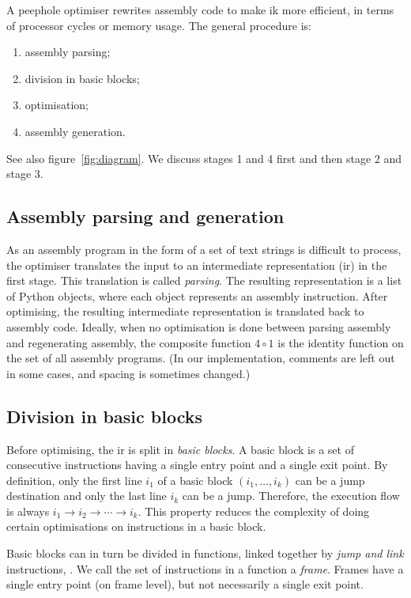 A peephole optimiser rewrites assembly code to make ik more efficient, in terms of processor cycles or memory usage. The general procedure is:
\begin{enumerate}
\item assembly parsing;
\item division in basic blocks;
\item optimisation;
\item assembly generation.
\end{enumerate}
See also figure~\ref{fig:diagram}. We discuss stages 1 and 4 first and then stage 2 and stage 3.

\subsection*{Assembly parsing and generation}
As an assembly program in the form of a set of text strings is difficult to process, the optimiser translates the input to an intermediate representation (ir) in the first stage. This translation is called \emph{parsing}. The resulting representation is a list of Python objects, where each object represents an assembly instruction. After optimising, the resulting intermediate representation is translated back to assembly code. Ideally, when no optimisation is done between parsing assembly and regenerating assembly, the composite function $4\circ 1$ is the identity function on the set of all assembly programs. (In our implementation, comments are left out in some cases, and spacing is sometimes changed.)

\subsection*{Division in basic blocks}
Before optimising, the ir is split in \emph{basic blocks}. A basic block is a set of consecutive instructions having a single entry point and a single exit point. By definition, only the first line $i_1$ of a basic block $(i_1, \ldots, i_k)$ can be a jump destination and only the last line $i_k$ can be a jump. Therefore, the execution flow is always $i_1\rightarrow i_2 \rightarrow \cdots \rightarrow i_k$. This property reduces the complexity of doing certain optimisations on instructions in a basic block.

Basic blocks can in turn be divided in functions, linked together by \emph{jump and link} instructions, . We call the set of instructions in a function a \emph{frame}. Frames have a single entry point (on frame level), but not necessarily a single exit point.

